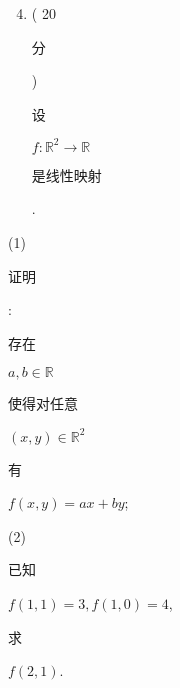 \documentclass[10pt]{article}
\begin{document}
\begin{enumerate}
  \setcounter{enumi}{3}
  \item ( 20 \begin{CJK}{UTF8}{mj}分\end{CJK}) \begin{CJK}{UTF8}{mj}设\end{CJK} $f: \mathbb{R}^{2} \rightarrow \mathbb{R}$ \begin{CJK}{UTF8}{mj}是线性映射\end{CJK}.
\end{enumerate}
(1) \begin{CJK}{UTF8}{mj}证明\end{CJK}: \begin{CJK}{UTF8}{mj}存在\end{CJK} $a, b \in \mathbb{R}$ \begin{CJK}{UTF8}{mj}使得对任意\end{CJK} $(x, y) \in \mathbb{R}^{2}$ \begin{CJK}{UTF8}{mj}有\end{CJK} $f(x, y)=a x+b y$;

(2) \begin{CJK}{UTF8}{mj}已知\end{CJK} $f(1,1)=3, f(1,0)=4$, \begin{CJK}{UTF8}{mj}求\end{CJK} $f(2,1)$.
\end{document}
